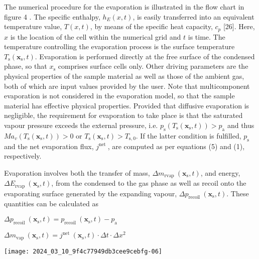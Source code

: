 \documentclass[10pt]{article}
\begin{document}
The numerical procedure for the evaporation is illustrated in the flow chart in figure 4 . The specific enthalpy, $h_{E}(x, t)$, is easily transferred into an equivalent temperature value, $T(x, t)$, by means of the specific heat capacity, $c_{p}$ [26]. Here, $x$ is the location of the cell within the numerical grid and $t$ is time. The temperature controlling the evaporation process is the surface temperature $T_{\mathrm{s}}\left(\boldsymbol{x}_{\mathrm{s}}, t\right)$. Evaporation is performed directly at the free surface of the condensed phase, so that $x_{\mathrm{s}}$ comprises surface cells only. Other driving parameters are the physical properties of the sample material as well as those of the ambient gas, both of which are input values provided by the user. Note that multicomponent evaporation is not considered in the evaporation model, so that the sample material has effective physical properties. Provided that diffusive evaporation is negligible, the requirement for evaporation to take place is that the saturated vapour pressure exceeds the external pressure, i.e. $p_{\mathrm{s}}\left(T_{\mathrm{s}}\left(\boldsymbol{x}_{\mathrm{s}}, t\right)\right)>p_{\mathrm{a}}$ and thus $M a_{v}\left(T_{\mathrm{s}}\left(\boldsymbol{x}_{\mathrm{s}}, t\right)\right)>0$ or $T_{\mathrm{s}}\left(\boldsymbol{x}_{\mathrm{s}}, t\right)>T_{\mathrm{s}, 0}$. If the latter condition is fulfilled, $p_{\mathrm{s}}$ and the net evaporation flux, $j^{\text {net }}$, are computed as per equations (5) and (1), respectively.

Evaporation involves both the transfer of mass, $\Delta m_{\text {rvap }}\left(\boldsymbol{x}_{\mathrm{s}}, t\right)$, and energy, $\Delta E_{\text {rvap }}\left(\boldsymbol{x}_{\mathrm{s}}, t\right)$, from the condensed to the gas phase as well as recoil onto the evaporating surface generated by the expanding vapour, $\Delta p_{\text {recoil }}\left(\boldsymbol{x}_{\mathrm{s}}, t\right)$. These quantities can be calculated as

$\Delta p_{\text {recoil }}\left(\boldsymbol{x}_{\mathrm{s}}, t\right)=p_{\text {recoil }}\left(\boldsymbol{x}_{\mathrm{s}}, t\right)-p_{\mathrm{a}}$

$\Delta m_{\text {vap }}\left(\boldsymbol{x}_{\mathrm{s}}, t\right)=j^{\text {net }}\left(\boldsymbol{x}_{\mathrm{s}}, t\right) \cdot \Delta t \cdot \Delta x^{2}$

\begin{center}
\texttt{[image: 2024\_03\_10\_9f4c77949db3cee9cebfg-06]}
\end{center}
\end{document}
